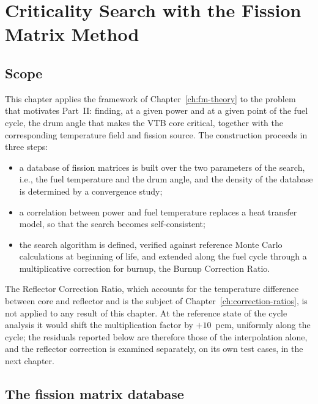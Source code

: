 

\chapter{Criticality Search with the Fission Matrix Method}\label{ch:crit-search}

\section{Scope}

This chapter applies the framework of Chapter~\ref{ch:fm-theory} to the
problem that motivates Part~II: finding, at a given power and at a given point
of the fuel cycle, the drum angle that makes the VTB core critical, together
with the corresponding temperature field and fission source. The
construction proceeds in three steps:
\begin{itemize}
  \item a database of fission matrices is built over the two parameters of the
  search, i.e., the fuel temperature and the drum angle, and the density of the
  database is determined by a convergence study;
  \item a correlation between power and fuel temperature replaces a heat
  transfer model, so that the search becomes self-consistent;
  \item the search algorithm is defined, verified against reference Monte Carlo
  calculations at beginning of life, and extended along the fuel cycle through a
  multiplicative correction for burnup, the Burnup Correction Ratio.
\end{itemize}

The Reflector Correction Ratio, which accounts for the temperature difference
between core and reflector and is the subject of
Chapter~\ref{ch:correction-ratios}, is not applied to any result of this
chapter. At the reference state of the cycle analysis it would shift the
multiplication factor by $+10$~pcm, uniformly along the cycle; the residuals
reported below are therefore those of the interpolation alone, and the
reflector correction is examined separately, on its own test cases, in the
next chapter.

\section{The fission matrix database}\label{cs:sec:database}

